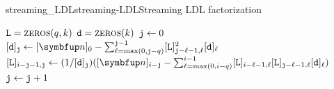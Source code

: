   
\begin{labelalgorithm}[htb]{streaming_LDL}{streaming-LDL}{Streaming LDL factorization}
\begin{algorithmic}[1]
\State $\texttt{L} = \textsc{zeros}(q,k)$
\State $\texttt{d} = \textsc{zeros}(k)$
\State $\texttt{j}\gets0$
    \State $[\ms{d}]_{\ms{j}} \gets [\vec{n}]_0 - \sum_{\ell=\max(0,\ms{j}-q)}^{\ms{j}-1} [\ms{L}]_{\ms{j}-\ell-1,\ell}^2 [\ms{d}]_{\ell}$
    \State $[\ms{L}]_{i-\ms{j}-1,\ms{j}} \gets (1/[\ms{d}]_{\ms{j}})([\vec{n}]_{i-\ms{j}} - \sum_{\ell=\max(0,i-q)}^{i-1} [\ms{L}]_{i-\ell-1,\ell} [\ms{L}]_{\ms{j}-\ell-1,\ell} [\ms{d}]_{\ell} )$
\EndFor
\State $\texttt{j}\gets \texttt{j}+1$
\EndProcedure
\EndClass
\end{algorithmic}
\end{labelalgorithm}

